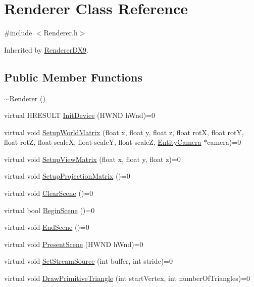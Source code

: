 \hypertarget{class_renderer}{\section{Renderer Class Reference}
\label{class_renderer}
}


{\ttfamily \#include $<$Renderer.\-h$>$}



Inherited by \hyperlink{class_renderer_d_x9}{Renderer\-D\-X9}.

\subsection*{Public Member Functions}
\begin{DoxyCompactItemize}
\item 
\hyperlink{class_renderer_afeee408862d5bd6255a6882d47e6d5cd}{$\sim$\-Renderer} ()
\item 
virtual H\-R\-E\-S\-U\-L\-T \hyperlink{class_renderer_a6313b523d721e6c2975a669af99a4c2b}{Init\-Device} (H\-W\-N\-D h\-Wnd)=0
\item 
virtual void \hyperlink{class_renderer_ac2a5819f123f462f4ed249be9427a228}{Setup\-World\-Matrix} (float x, float y, float z, float rot\-X, float rot\-Y, float rot\-Z, float scale\-X, float scale\-Y, float scale\-Z, \hyperlink{class_entity_camera}{Entity\-Camera} $\ast$camera)=0
\item 
virtual void \hyperlink{class_renderer_a872dd40fa890c4bd2b5ef28036e14d75}{Setup\-View\-Matrix} (float x, float y, float z)=0
\item 
virtual void \hyperlink{class_renderer_ab6dd3468007966dd81900ed3c4dd5873}{Setup\-Projection\-Matrix} ()=0
\item 
virtual void \hyperlink{class_renderer_ab7ed63f63bcc6726d40e2a43cc3a585e}{Clear\-Scene} ()=0
\item 
virtual bool \hyperlink{class_renderer_a32e27baaab853cc2d24605b831bcda75}{Begin\-Scene} ()=0
\item 
virtual void \hyperlink{class_renderer_abdf143dedfb79932050c37cf0f4449bd}{End\-Scene} ()=0
\item 
virtual void \hyperlink{class_renderer_a9dfa1935125f68f2c169c447a66aaf39}{Present\-Scene} (H\-W\-N\-D h\-Wnd)=0
\item 
virtual void \hyperlink{class_renderer_a9bf165a1520c271b7bbfee6a70766a77}{Set\-Stream\-Source} (int buffer, int stride)=0
\item 
virtual void \hyperlink{class_renderer_a16ae452ed8535d6ebada62910699dc11}{Draw\-Primitive\-Triangle} (int start\-Vertex, int number\-Of\-Triangles)=0

\end{DoxyCompactItemize}
